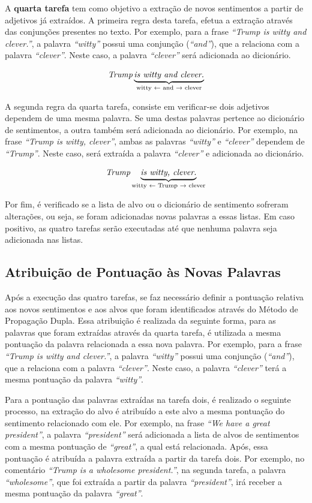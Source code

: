 A \textbf{quarta tarefa} tem como objetivo a extração de novos sentimentos a
partir de adjetivos já extraídos. A primeira regra desta tarefa, efetua a extração através
das conjunções presentes no texto. Por exemplo, para a frase \textit{``Trump is
witty and clever.''}, a palavra \textit{``witty''} possui uma conjunção
(\textit{``and''}), que a relaciona com a palavra \textit{``clever''}. Neste
caso, a palavra \textit{``clever''} será adicionada ao dicionário.

\[\textit{Trump} \underbrace{\textit{is witty and clever.}}_\text{witty
\textleftarrow \text{ and} \textrightarrow \text{ clever}}\]


A segunda regra da quarta tarefa, consiste em verificar-se dois adjetivos
dependem de uma mesma palavra. Se uma destas palavras pertence ao dicionário de
sentimentos, a outra também será adicionada ao dicionário. Por exemplo, na frase
\textit{``Trump is witty, clever''}, ambas as palavras \textit{``witty''} e
\textit{``clever''} dependem de \textit{``Trump''}. Neste caso, será extraída a
palavra \textit{``clever''} e adicionada ao dicionário.

\[\textit{Trump} \underbrace{\textit{is witty, clever.}}_\text{witty
\textleftarrow \text{ Trump} \textrightarrow \text{ clever}}\]

Por fim, é verificado se a lista de alvo ou o dicionário de sentimento sofreram
alterações, ou seja, se foram adicionadas novas palavras a essas listas. Em caso
positivo, as quatro tarefas serão executadas até que nenhuma palavra seja
adicionada nas listas.

\subsection{Atribuição de Pontuação às Novas Palavras}

Após a execução das quatro tarefas, se faz necessário definir a
pontuação relativa aos novos sentimentos e aos alvos que foram identificados
através do Método de Propagação Dupla. Essa atribuição é realizada da seguinte forma,
para as palavras que foram extraídas através da quarta tarefa, é utilizada a
mesma pontuação da palavra relacionada a essa nova palavra. Por exemplo, para a frase \textit{``Trump is
witty and clever.''}, a palavra \textit{``witty''} possui uma conjunção
(\textit{``and''}), que a relaciona com a palavra \textit{``clever''}. Neste
caso, a palavra \textit{``clever''} terá a mesma pontuação da palavra
\textit{``witty''}.

Para a pontuação das palavras extraídas na tarefa dois, é realizado o seguinte
processo, na extração do alvo é atribuído a este alvo a mesma pontuação do
sentimento relacionado com ele. Por exemplo, na frase \textit{``We have a great
president''}, a palavra \textit{``president''} será adicionada a lista de alvos
de sentimentos com a mesma pontuação de \textit{``great''}, a qual está
relacionada. Após, essa pontuação é atribuída a palavra extraída a partir
da tarefa dois.
Por exemplo, no comentário \textit{``Trump is a wholesome president.''}, na
segunda tarefa, a palavra \textit{``wholesome''}, que foi extraída a partir da
palavra \textit{``president''}, irá receber a mesma pontuação da palavra
\textit{``great''}.

